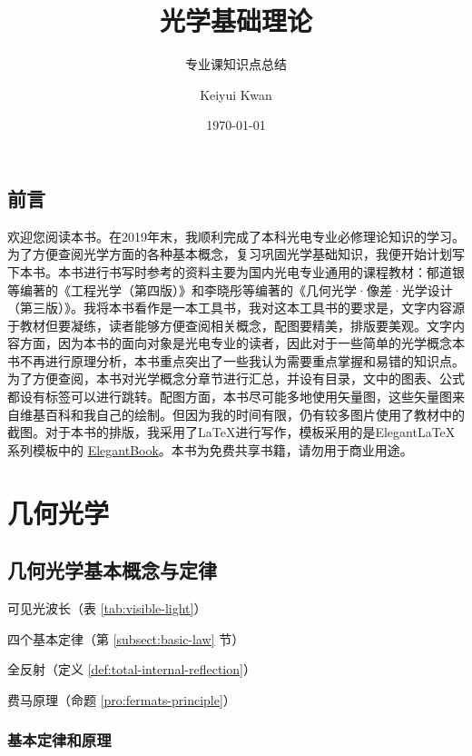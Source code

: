 \documentclass[cn,10pt,chinesefont=founder,math=newtx,cite=super,twoside]{elegantbook}
\title{光学基础理论}
\subtitle{专业课知识点总结}
\author{Keiyui Kwan}
\institute{Zhejiang University}
\date{\today}
\begin{document}
	
\maketitle
\frontmatter
	
\chapter*{前言}
欢迎您阅读本书。在2019年末，我顺利完成了本科光电专业必修理论知识的学习。为了方便查阅光学方面的各种基本概念，复习巩固光学基础知识，我便开始计划写下本书。本书进行书写时参考的资料主要为国内光电专业通用的课程教材：郁道银等编著的《工程光学（第四版）》和李晓彤等编著的《几何光学·像差·光学设计（第三版）》。我将本书看作是一本工具书，我对这本工具书的要求是，文字内容源于教材但要凝练，读者能够方便查阅相关概念，配图要精美，排版要美观。文字内容方面，因为本书的面向对象是光电专业的读者，因此对于一些简单的光学概念本书不再进行原理分析，本书重点突出了一些我认为需要重点掌握和易错的知识点。为了方便查阅，本书对光学概念分章节进行汇总，并设有目录，文中的图表、公式都设有标签可以进行跳转。配图方面，本书尽可能多地使用矢量图，这些矢量图来自维基百科和我自己的绘制。但因为我的时间有限，仍有较多图片使用了教材中的截图。对于本书的排版，我采用了\LaTeX 进行写作，模板采用的是Elegant\LaTeX 系列模板中的 \href{https://github.com/ElegantLaTeX/ElegantBook}{ElegantBook}。本书为免费共享书籍，请勿用于商业用途。

\tableofcontents
\mainmatter

\part{几何光学}

\chapter{几何光学基本概念与定律}

\begin{introduction}
	\item 可见光波长（表 \ref{tab:visible-light}）
	\item 四个基本定律（第 \ref{subsect:basic-law} 节）
	\item 全反射（定义 \ref{def:total-internal-reflection}）
	\item 费马原理（命题 \ref{pro:fermats-principle}）
\end{introduction}

\section{基本定律和原理}
\end{document}
